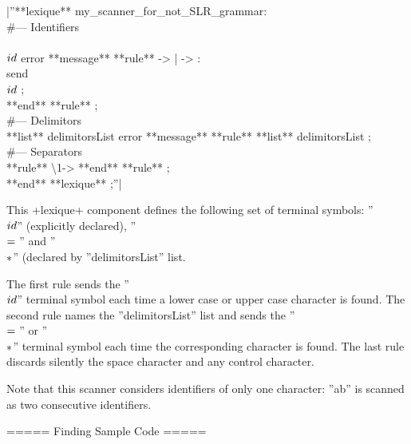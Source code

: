 |''**lexique** my\_scanner\_for\_not\_SLR\_grammar:\\ 
\#--- Identifiers\\ 
\\$id\\$ error **message** %
**rule** \textquotesingle -> \textquotesingle | \textquotesingle -> \textquotesingle :\\ 
 send \\$id\\$ ;\\ **end** **rule** ;\\ 
\#--- Delimitors\\ 
**list** delimitorsList error **message** %
**rule** **list** delimitorsList ;\\ 
\#--- Separators\\ 
**rule** \textquotesingle\textbackslash{1}\textquotesingle -> %
**end** **rule** ;\\ 
**end** **lexique** ;''|

This \ggs+lexique+ component defines the following set of terminal symbols: ''\\$id\\$'' (explicitly declared), ''\\$=\\$'' and ''\\$*\\$'' (declared  by ''delimitorsList'' list.

The first rule sends the ''\\$id\\$'' terminal symbol each time a lower case or upper case character is found. The second rule names the ''delimitorsList'' list and sends the ''\\$=\\$'' or ''\\$*\\$'' terminal symbol each time the corresponding character is found. The last rule discards silently the space character and any control character.

Note that this scanner considers identifiers of only one character: ''ab'' is scanned as two consecutive identifiers.

===== Finding Sample Code =====

